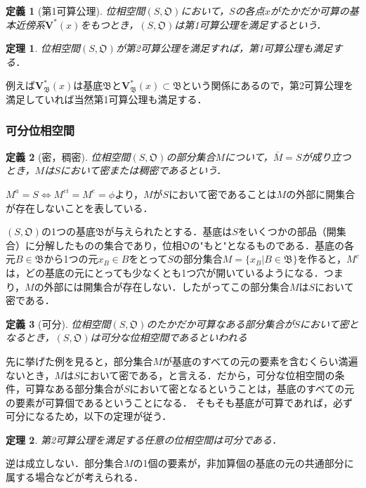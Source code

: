 \documentclass[a4paper,10pt,uplatex]{jsarticle}
\numberwithin{equation}{section}
\theoremstyle{mystyle}
\newtheorem{dfn}{定義}[section]
\newtheorem{thm}{定理}[section]
\newcommand{\gB}{\mathfrak{B}}
\newcommand{\gO}{\mathfrak{O}}
\begin{document}
\begin{dfn}[第1可算公理]
    位相空間$(S,\gO)$において，$S$の各点$x$がたかだか可算の基本近傍系$\bm{V}^*(x)$をもつとき，$(S,\gO)$は第1可算公理を満足するという．
\end{dfn}

\begin{thm}
    位相空間$(S,\gO)$が第2可算公理を満足すれば，第1可算公理も満足する．
\end{thm}
例えば$\bm{V}_\gB^*(x)$は基底$\gB$と$\bm{V}_\gB^*(x) \subset \gB$という関係にあるので，第2可算公理を満足していれば当然第1可算公理も満足する．

\subsubsection{可分位相空間}
\begin{dfn}[密，稠密]
    位相空間$(S,\gO)$の部分集合$M$について，$\bar{M} = S$が成り立つとき，$M$は$S$において密または稠密であるという．
\end{dfn}
$M^a = S \Leftrightarrow M^{ci} = M^e = \phi$より，$M$が$S$において密であることは$M$の外部に開集合が存在しないことを表している．

$(S,\gO)$の1つの基底$\gB$が与えられたとする．基底は$S$をいくつかの部品（開集合）に分解したものの集合であり，位相$\gO$の"もと"となるものである．基底の各元$B \in \gB$から1つの元$x_B \in B$をとって$S$の部分集合$M = \{x_B | B \in \gB\}$を作ると，$M^c$は，どの基底の元にとっても少なくとも1つ穴が開いているようになる．つまり，$M$の外部には開集合が存在しない．したがってこの部分集合$M$は$S$において密である．

\begin{dfn}[可分]
    位相空間$(S,\gO)$のたかだか可算なある部分集合が$S$において密となるとき，$(S,\gO)$は可分な位相空間であるといわれる
\end{dfn}

先に挙げた例を見ると，部分集合$M$が基底のすべての元の要素を含むくらい満遍ないとき，$M$は$S$において密である，と言える．だから，可分な位相空間の条件，可算なある部分集合が$S$において密となるということは，基底のすべての元の要素が可算個であるということになる．
そもそも基底が可算であれば，必ず可分になるため，以下の定理が従う．

\begin{thm}
    第2可算公理を満足する任意の位相空間は可分である．
\end{thm}

逆は成立しない．部分集合$M$の1個の要素が，非加算個の基底の元の共通部分に属する場合などが考えられる．
\end{document}
